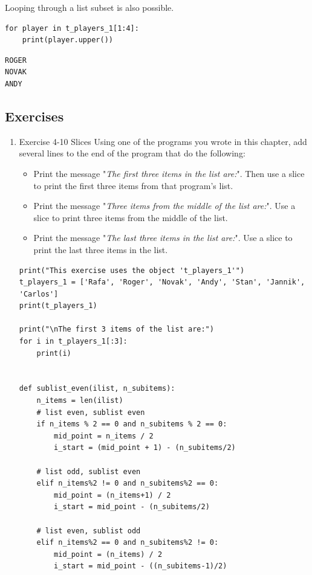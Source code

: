 \documentclass[10pt]{book}
\begin{document}
Looping through a list subset is also possible.

\label{org86f2a7f}
\begin{verbatim}
for player in t_players_1[1:4]:
    print(player.upper())
\end{verbatim}

\label{org15f954e}
\begin{verbatim}
ROGER
NOVAK
ANDY
\end{verbatim}
\subsection{Exercises}
\label{sec:orge1bfca1}
\begin{enumerate}
\item Exercise 4-10 Slices
\label{sec:org782b0cb}
Using one of the programs you wrote in this chapter, add several lines to the end of the program that do the following:

\begin{itemize}
\item Print the message "\emph{The first three items in the list are:}". Then use a slice to print the first three items from that program’s list.
\item Print the message "\emph{Three items from the middle of the list are:}". Use a slice to print three items from the middle of the list.
\item Print the message "\emph{The last three items in the list are:}". Use a slice to print the last three items in the list.
\end{itemize}
\begin{verbatim}
print("This exercise uses the object 't_players_1'")
t_players_1 = ['Rafa', 'Roger', 'Novak', 'Andy', 'Stan', 'Jannik', 'Carlos']
print(t_players_1)

print("\nThe first 3 items of the list are:")
for i in t_players_1[:3]:
    print(i)


def sublist_even(ilist, n_subitems):
    n_items = len(ilist)
    # list even, sublist even
    if n_items % 2 == 0 and n_subitems % 2 == 0:
        mid_point = n_items / 2
        i_start = (mid_point + 1) - (n_subitems/2)

    # list odd, sublist even
    elif n_items%2 != 0 and n_subitems%2 == 0:
        mid_point = (n_items+1) / 2
        i_start = mid_point - (n_subitems/2)

    # list even, sublist odd
    elif n_items%2 == 0 and n_subitems%2 != 0:
        mid_point = (n_items) / 2
        i_start = mid_point - ((n_subitems-1)/2)


\end{verbatim}
\end{enumerate}
\end{document}

